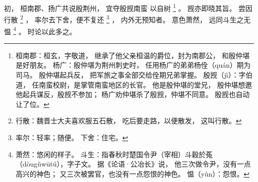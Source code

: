 
\switchcolumn*[\section{}]

初，
桓南郡、扬广共说殷荆州，
宜夺殷觊南蛮
以自树%
\footnote{%
    桓南郡：桓玄，字敬道，
            继承了他父亲桓温的爵位，封为南郡公，
            和殷仲堪是好朋友。
    杨广：殷仲堪为荆州刺史时，
          任用杨广的弟弟杨佺（quán）期为司马。
          殷仲堪起兵反，
          把军旅之事全部交给佺期兄弟掌握。
    殷觊（jì）：字伯道，
                任南蛮校尉，是掌管南蛮地区的长官。
                他是殷仲堪的堂兄，
                殷仲堪想邀他起兵谋反，殷觊不参加；
                杨广劝仲堪杀了殷觊，仲堪不同意。
                殷觊也自动让了位。
}%
。
觊亦即晓其旨。
尝因行散%
\footnote{%
    行散：魏晋士大夫喜欢服五石散，
          吃后要走路，以便散发，
          这叫行散。
}%
，
率尔去下舍，便不复还%
\footnote{%
    率尔：轻率；随便。
    下舍：住宅。
}%
，
内外无预知者。
意色萧然，
远同斗生之无愠%
\footnote{%
    萧然：悠闲的样子。
    斗生：指春秋时楚国令尹（宰相）斗穀於菟（dòugǔwūtú），字子文。
          据《论语·公冶长》说，
          他三次做令尹，没有一点高兴的神色；
          又三次被罢官，也没有一点怨恨的神色。
    愠（yùn）：怨恨。
}%
。
时论以此多之。

\switchcolumn



